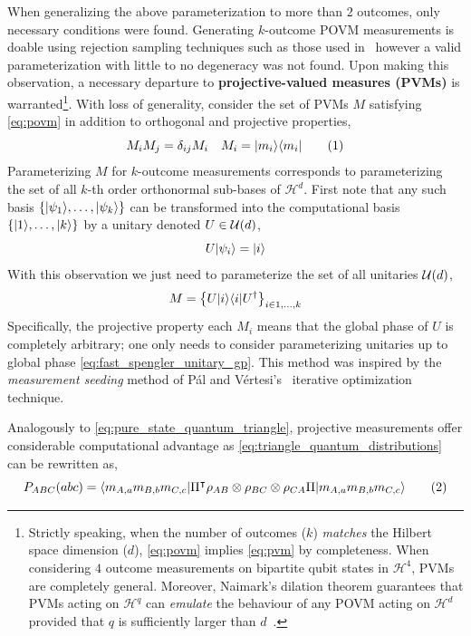\documentclass[aps, 10pt, english, twoside, pra, nofootinbib, longbibliography]{revtex4-1}
\theoremstyle{plain}
\theoremstyle{definition}
\theoremstyle{remark}
\newcommand{\netperm}{\Pi}
\newcommand{\Hilb}{\mathcal{H}}
\newcommand{\term}[1]{\textcolor{Mahogany}{\textbf{#1}}}
\begin{document}
    When generalizing the above parameterization to more than $2$ outcomes, only necessary conditions were found. Generating $k$-outcome POVM measurements is doable using rejection sampling techniques such as those used in~\cite{Petz_2012} however a valid parameterization with little to no degeneracy was not found. Upon making this observation, a necessary departure to \term{projective-valued measures (PVMs)} is warranted\footnote{Strictly speaking, when the number of outcomes ($k$) \textit{matches} the Hilbert space dimension ($d$), \cref{eq:povm} implies \cref{eq:pvm} by completeness. When considering $4$ outcome measurements on bipartite qubit states in $\Hilb^4$, PVMs are completely general. Moreover, Naimark's dilation theorem guarantees that PVMs acting on $\Hilb^q$ can \textit{emulate} the behaviour of any POVM acting on $\Hilb^d$ provided that $q$ is sufficiently larger than $d$~\cite{Naimark}.}. With loss of generality, consider the set of PVMs $M$ satisfying \cref{eq:povm} in addition to orthogonal and projective properties,
    \[ M_i M_j = \de_{ij} M_i \quad M_i = \ket{m_i}\bra{m_i} \eq \label{eq:pvm}\]
    Parameterizing $M$ for $k$-outcome measurements corresponds to parameterizing the set of all $k$-th order orthonormal sub-bases of $\Hilb^d$.
    First note that any such basis $\bc{\ket{\psi_1}, \ldots, \ket{\psi_k}}$ can be transformed into the computational basis $\bc{\ket{1}, \ldots, \ket{k}}$ by a unitary denoted $U \in \mathcal{U}\br{d}$,
    \[ U \ket{\psi_i} = \ket{i} \]
    With this observation we just need to parameterize the set of all unitaries $\mathcal{U}\br{d}$,
    \[ M = \bc{ U\ket{i}\bra{i}U^\dagger }_{i \in 1, \ldots, k} \]
    Specifically, the projective property each $M_i$ means that the global phase of $U$ is completely arbitrary; one only needs to consider parameterizing unitaries up to global phase \cref{eq:fast_spengler_unitary_gp}. This method was inspired by the \textit{measurement seeding} method of P{\'{a}}l and V{\'{e}}rtesi's~\cite{Pal_2010} iterative optimization technique.

    Analogously to \cref{eq:pure_state_quantum_triangle}, projective measurements offer considerable computational advantage as \cref{eq:triangle_quantum_distributions} can be rewritten as,
    \[ \prob[ABC]\br{abc} = \bramidket{m_{A,a}m_{B,b}m_{C,c}}{\netperm^\intercal \rho_{AB}\otimes\rho_{BC}\otimes\rho_{CA} \netperm}{m_{A,a}m_{B,b}m_{C,c}} \eq \label{eq:pure_meas_quantum_triangle} \]
\end{document}
